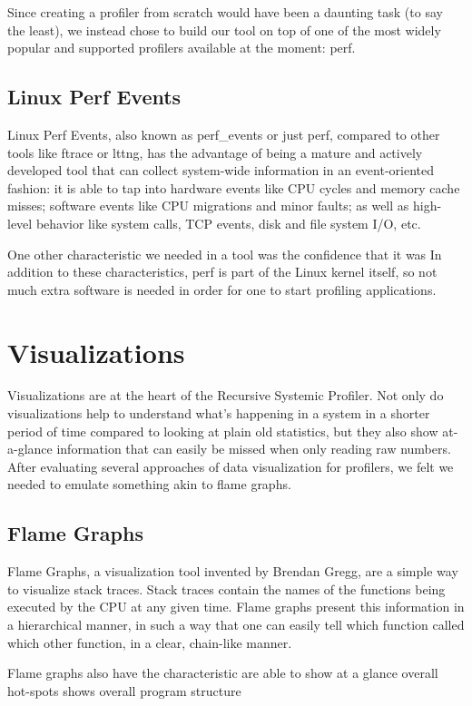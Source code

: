\documentclass[10pt]{article}
\begin{document}
Since creating a profiler from scratch would have been a daunting task (to say the least), we instead chose to build our tool on top of one of the most widely popular and supported profilers available at the moment: perf.

\subsection{Linux Perf Events}

Linux Perf Events, also known as perf\_events or just perf, compared to other tools like ftrace or lttng, has the advantage of being a mature and actively developed tool that can collect system-wide information in an event-oriented fashion: it is able to tap into hardware events like CPU cycles and memory cache misses; software events like CPU migrations and minor faults; as well as high-level behavior like system calls, TCP events, disk and file system I/O, etc.

One other characteristic we needed in a tool was the confidence that it was  In addition to these characteristics, perf is part of the Linux kernel itself, so not much extra software is needed in order for one to start profiling applications.

\section{Visualizations}
Visualizations are at the heart of the Recursive Systemic Profiler. Not only do visualizations help to understand what's happening in a system in a shorter period of time compared to looking at plain old statistics, but they also show at-a-glance information that can easily be missed when only reading raw numbers. After evaluating several approaches of data visualization for profilers, we felt we needed to emulate something akin to flame graphs.

\subsection{Flame Graphs}
Flame Graphs, a visualization tool invented by Brendan Gregg, are a simple way to visualize stack traces. Stack traces contain the names of the functions being executed by the CPU at any given time. Flame graphs present this information in a hierarchical manner, in such a way that one can easily tell which function called which other function, in a clear, chain-like manner.

Flame graphs also have the characteristic  are able to show at a glance overall hot-spots shows overall program structure
\end{document}
